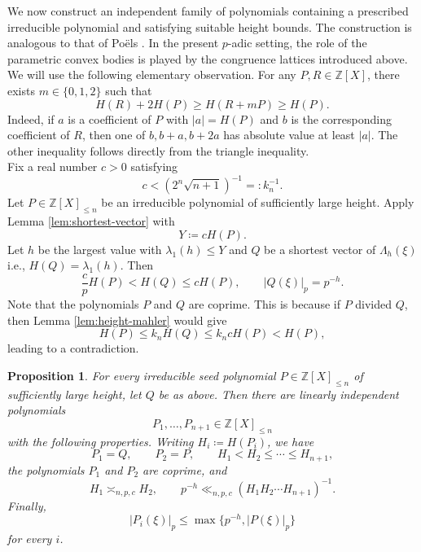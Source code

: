 \documentclass[10pt,a4paper]{amsart}
\newtheorem{proposition}[theorem]{Proposition}
\newcommand{\Z}{\mathbb Z}
\begin{document}
We now construct an independent family of polynomials containing a prescribed irreducible polynomial and satisfying suitable height bounds. The construction is analogous to that of Po\"els \cite[Lemma~4.1]{PoelsWirsing}. In the present $p$-adic setting, the role of the parametric convex bodies is played by the congruence lattices introduced above.\\

We will use the following elementary observation. For any
$P,R\in\Z[X]$, there exists $m\in\{0,1,2\}$ such that
\begin{equation}\label{eq:bounded-adjustment}
H(R)+2H(P) \geq H(R+mP)\geq H(P).
\end{equation}
Indeed, if $a$ is a coefficient of $P$ with $|a|=H(P)$ and $b$ is the
corresponding coefficient of $R$, then one of $b,b+a,b+2a$ has absolute value
at least $|a|$. The other inequality follows directly from the triangle inequality.\\

Fix a real number $c>0$ satisfying
$$
 c< (2^n\sqrt{n+1})^{-1} =: k_n^{-1}.
$$
Let $P\in\Z[X]_{\leq n}$ be an irreducible polynomial of sufficiently large height. Apply Lemma \ref{lem:shortest-vector} with
$$
Y\coloneqq cH(P).
$$
Let $h$ be the largest value with $\lambda_1(h)\leq Y$ and $Q$ be a shortest vector of $\Lambda_h(\xi)$ i.e., $H(Q)=\lambda_1(h)$. Then
$$
\frac{c}{p}H(P)<H(Q)\leq cH(P),
\qquad |Q(\xi)|_p=p^{-h}.
$$
Note that the polynomials $P$ and $Q$ are coprime. This is because if $P$ divided $Q$, then Lemma \ref{lem:height-mahler} would give
$$
H(P)\leq k_nH(Q)\leq k_ncH(P)<H(P),
$$
leading to a contradiction.\\

\begin{proposition}\label{prop:family}
For every irreducible seed polynomial $P\in\Z[X]_{\leq n}$ of sufficiently
large height, let $Q$ be as above. Then there are linearly independent polynomials
$$
P_1,\ldots,P_{n+1}\in\Z[X]_{\leq n}
$$
with the following properties. Writing $H_i\coloneqq H(P_i)$, we have
$$
P_1=Q,
\qquad P_2=P,
\qquad H_1<H_2\leq\cdots\leq H_{n+1},
$$
the polynomials $P_1$ and $P_2$ are coprime, and
$$
H_1\asymp_{n,p,c}H_2,
\qquad
p^{-h}\ll_{n,p,c}(H_1H_2\cdots H_{n+1})^{-1}.
$$
Finally,
$$
|P_i(\xi)|_p
\leq\max\{p^{-h},|P(\xi)|_p\}
$$
for every $i$.
\end{proposition}
\end{document}

